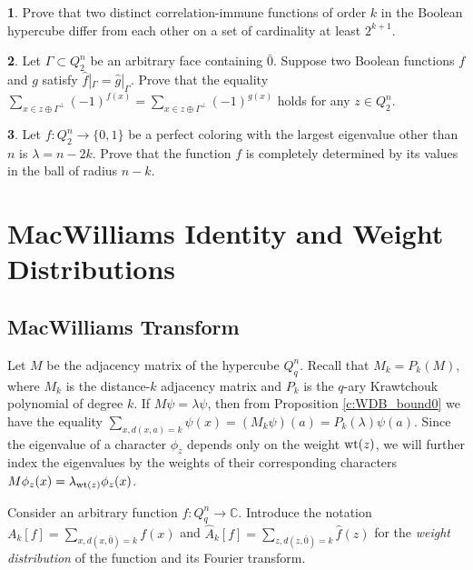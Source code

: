 \documentclass[11pt]{article}
\theoremstyle{definition}
\newtheorem{exercise}{\quad}
\newcommand{\wt}{{\rm wt}}
\begin{document}
{{{\begin{exercise}
Prove that two distinct correlation-immune functions of order $k$ in the Boolean hypercube differ from each other on a set of cardinality at least $2^{k+1}$.
\end{exercise}

\begin{exercise}
Let $\Gamma\subset  Q_2^n$ be an arbitrary face containing $\bar{0}$. Suppose two Boolean functions $f$ and $g$ satisfy  $\widehat{f}|_\Gamma=\widehat{g}|_\Gamma$. Prove that the equality $\sum\limits_{x\in z\oplus\Gamma^\perp}(-1)^{f(x)}=\sum\limits_{x\in z\oplus\Gamma^\perp}(-1)^{g(x)}$ holds for any $z\in  Q_2^n$.
\end{exercise}

\begin{exercise}
Let $f:Q^n_2\rightarrow \{0,1\}$ be a perfect coloring with the largest eigenvalue other than  $n$ is  $\lambda=n-2k$. Prove that the function $f$ is completely determined by its values in the ball of radius $n-k$.
\end{exercise}









\section{MacWilliams  Identity and Weight Distributions}


\subsection{MacWilliams Transform}


Let $M$ be the adjacency matrix of the hypercube $Q^n_q$. Recall that $M_k=P_k(M)$, where $M_k$ is the distance-$k$ adjacency matrix and $P_k$ is the $q$-ary Krawtchouk polynomial of degree $k$. If $M\psi=\lambda\psi$, then from Proposition \ref{c:WDB_bound0} we have the equality
$\sum\limits_{x,d(x,a)=k}\psi(x)=(M_k\psi)(a)=P_k(\lambda)\psi(a)$.
Since the eigenvalue of a character $\phi_z$ depends only on the weight $\wt(z)$, we will further index the eigenvalues by the weights of their corresponding characters
$M\phi_z(x)=\lambda_{\wt(z)}\phi_z(x)$.

Consider an arbitrary function $f:Q^n_q\rightarrow \mathbb{C}$.
Introduce the notation $A_k[f]=\sum\limits_{x,d(x,\bar 0)=k}f(x)$ and
$\widehat{A}_k[f]=\sum\limits_{z,d(z,\bar 0)=k}\widehat{f}(z)$ for the {\sl weight distribution} of the function and its Fourier transform.

}}}
\end{document}
